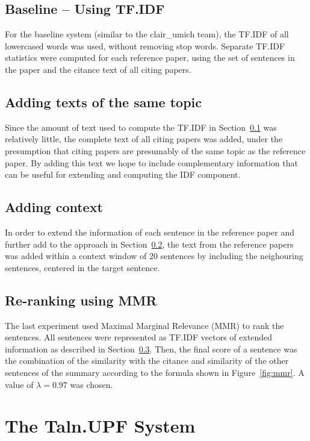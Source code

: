 \documentclass[11pt]{article}
\begin{document}
\subsection{Baseline -- Using TF.IDF}
\label{sec:tfidf}
For the baseline system (similar to the clair\_umich team), the TF.IDF
of all lowercased words was used, without removing stop
words. Separate TF.IDF statistics were computed for each reference
paper, using the set of sentences in the paper and the citance text of
all citing papers.

\subsection{Adding texts of the same topic}
\label{sec:topics}
Since the amount of text used to compute the TF.IDF in
Section~\ref{sec:tfidf} was relatively little, the complete text of
all citing papers was added, under the presumption that citing papers
are presumably of the same topic as the reference paper. By adding
this text we hope to include complementary information that can be
useful for extending and computing the IDF component.

\subsection{Adding context}
\label{sec:context}
In order to  extend the information of each sentence in the reference paper 
and further add to the approach in Section~\ref{sec:topics}, the text from 
the reference papers was added within a context window of 20 sentences by 
including the neighouring sentences, centered in the target sentence.


\subsection{Re-ranking using MMR}
\label{sec:mmr}
The last experiment used Maximal Marginal Relevance (MMR) \cite{Carbonell:1998} 
to rank the sentences. All sentences were represented as TF.IDF vectors 
of extended information as described in Section~\ref{sec:context}. Then, the 
final score of a sentence was the combination of the similarity with the 
citance and similarity of the other sentences of the summary according to the 
formula shown in Figure~\ref{fig:mmr}. A value of $\lambda=0.97$ was chosen.

\section{The Taln.UPF System}
\end{document}
